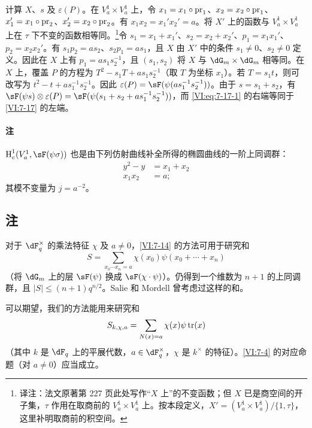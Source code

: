 计算 $X$、$s$ 及 $\varepsilon(P)$。在 $V_a^1\times V_a^1$ 上，令 $x_1=x_1\circ\mathrm{pr}_1$、$x_2=x_2\circ\mathrm{pr}_1$、$x_1'=x_1\circ \mathrm{pr}_2$、$x_2'=x_2\circ \mathrm{pr}_2$。有 $x_1 x_2=x_1'x_2'=a$。将 $X'$ 上的函数与 $V_a^1\times V_a^1$ 上在 $\tau$ 下不变的函数相等同。\footnote{译注：法文原著第 227 页此处写作“$X$ 上”的不变函数；但 $X$ 已是商空间的开子集，$\tau$ 作用在取商前的 $V_a^1\times V_a^1$ 上。按本段定义，$X'=(V_a^1\times V_a^1)/\{1,\tau\}$，这里补明取商前的积空间。}令 $s_1=x_1+x_1'$、$s_2=x_2+x_2'$、$p_1=x_1 x_1'$、$p_2=x_2 x_2'$。有 $s_1 p_2 = a s_2$、$s_2 p_1 = a s_1$，且 $X$ 由 $X'$ 中的条件 $s_1\ne 0$、$s_2\ne 0$ 定义。因此在 $X$ 上有 $p_1 = a s_1 s_2^{-1}$，且 $(s_1,s_2)$ 将 $X$ 与 $\dG_m\times \dG_m$ 相等同。在 $X$ 上，覆盖 $P$ 的方程为 $T^2-s_1 T+a s_1 s_2^{-1}$（取 $T$ 为坐标 $x_1$）。若 $T=s_1 t$，则可改写为 $t^2-t+a s_1^{-1} s_2^{-1}$。因此 $\varepsilon(P) = \sF(\psi(a s_1^{-1} s_2^{-1}))$。由于 $s=s_1+s_2$，有 $\sF(\psi s)\otimes \varepsilon(P) = \sF(\psi(s_1+s_2+ a s_1^{-1} s_2^{-1}))$，而 \eqref{VI:eq:7-17-1} 的右端等同于 \ref{VI:7-17} 的左端。

\paragraph{注}

$\h_c^1(V_a^1,\sF(\psi\sigma))$ 也是由下列仿射曲线补全所得的椭圆曲线的一阶上同调群：
\begin{align*}
  y^2-y &= x_1+x_2 \\
  x_1 x_2 &= a \text{;}
\end{align*}
其模不变量为 $j=a^{-2}$。

\subsection{注}\label{VI:7-18}

对于 $\dF_q^\times$ 的乘法特征 $\chi$ 及 $a\ne 0$，\ref{VI:7-14} 的方法可用于研究和
\[
  S = \sum_{x_0\dotsm x_n = a} \chi(x_0) \psi(x_0+\cdots + x_n)
\]
（将 $\dG_m$ 上的层 $\sF(\psi)$ 换成 $\sF(\chi\cdot \psi)$）。仍得到一个维数为 $n+1$ 的上同调群，且 $|S|\leqslant (n+1)q^{n/2}$。Salie 和 Mordell \cite{mo73} 曾考虑过这样的和。

可以期望，我们的方法能用来研究和
\[
  S_{k,\chi,a} = \sum_{N(x)=a} \chi(x) \psi \operatorname{tr}(x)
\]
（其中 $k$ 是 $\dF_q$ 上的平展代数，$a\in \dF_q^\times$，$\chi$ 是 $k^\times$ 的特征）。\ref{VI:7-4} 的对应命题（对 $a\ne 0$）应当成立。

